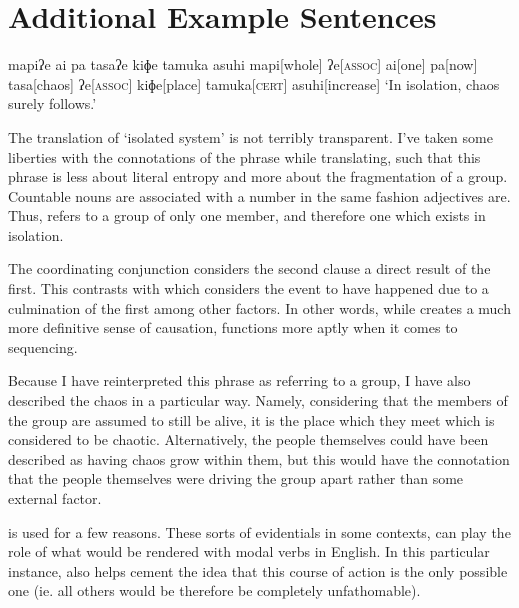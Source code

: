 \chapter{Additional Example Sentences}
\ex
\begingl
\glpreamble mapiʔe ai pa tasaʔe kiɸe tamuka asuhi
\endpreamble
\nogloss{\lbrack}
mapi[whole]
ʔe[\textsc{assoc}]
ai[one]
\nogloss{\rbrack}
pa[now]
tasa[chaos]
ʔe[\textsc{assoc}]
kiɸe[place]
tamuka[\textsc{cert}]
asuhi[increase]
\glft `In isolation, chaos surely follows.'\footnotemark\\
\endgl
\xe


The translation of `isolated system' is not terribly transparent.
I've taken some liberties with the connotations of the phrase while translating, such that this phrase is less about literal entropy and more about the fragmentation of a group.
Countable nouns are associated with a number in the same fashion adjectives are.
Thus,  refers to a group of only one member, and therefore one which exists in isolation.

The coordinating conjunction  considers the second clause a direct result of the first.
This contrasts with  which considers the event to have happened due to a culmination of the first among other factors.
In other words, while  creates a much more definitive sense of causation,  functions more aptly when it comes to sequencing.

Because I have reinterpreted this phrase as referring to a group, I have also described the chaos in a particular way.
Namely, considering that the members of the group are assumed to still be alive, it is the place which they meet which is considered to be chaotic.
Alternatively, the people themselves could have been described as having chaos grow within them, but this would have the connotation that the people themselves were driving the group apart rather than some external factor.

 is used for a few reasons.
These sorts of evidentials in some contexts, can play the role of what would be rendered with modal verbs in English.
In this particular instance,  also helps cement the idea that this course of action is the only possible one (ie. all others would be therefore be completely unfathomable).

